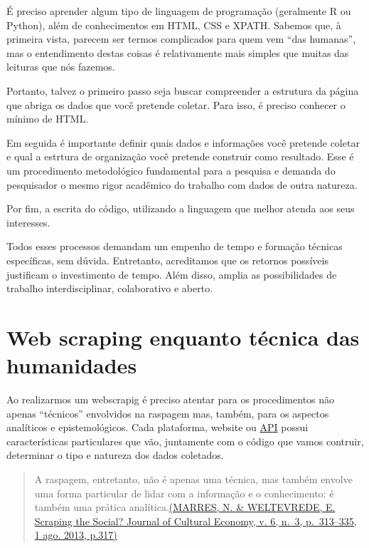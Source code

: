 \documentclass[
]{book}
\begin{document}
É preciso aprender algum tipo de linguagem de programação (geralmente R ou Python), além de conhecimentos em HTML, CSS e XPATH. Sabemos que, à primeira vista, parecem ser termos complicados para quem vem ``das humanas'', mas o entendimento destas coisas é relativamente mais simples que muitas das leituras que nós fazemos.

Portanto, talvez o primeiro passo seja buscar compreender a estrutura da página que abriga os dados que você pretende coletar. Para isso, é preciso conhecer o mínimo de HTML.

Em seguida é importante definir quais dados e informações você pretende coletar e qual a estrtura de organização você pretende construir como resultado. Esse é um procedimento metodológico fundamental para a pesquisa e demanda do pesquisador o mesmo rigor acadêmico do trabalho com dados de outra natureza.

Por fim, a escrita do código, utilizando a linguagem que melhor atenda aos seus interesses.

Todos esses processos demandam um empenho de tempo e formação técnicas específicas, sem dúvida. Entretanto, acreditamos que os retornos possíveis justificam o investimento de tempo. Além disso, amplia as possibilidades de trabalho interdisciplinar, colaborativo e aberto.

\hypertarget{web-scraping-enquanto-tuxe9cnica-das-humanidades}{%
\section{Web scraping enquanto técnica das humanidades}\label{web-scraping-enquanto-tuxe9cnica-das-humanidades}}

Ao realizarmos um webscrapig é preciso atentar para os procedimentos não apenas ``técnicos'' envolvidos na raspagem mas, também, para os aspectos analíticos e epistemológicos. Cada plataforma, website ou \href{https://canaltech.com.br/software/o-que-e-api/}{API} possui características particulares que vão, juntamente com o código que vamos contruir, determinar o tipo e natureza dos dados coletados.

\begin{quote}
A raspagem, entretanto, não é apenas uma técnica, mas também envolve uma forma particular de lidar com a informação e o conhecimento: é também uma prática analítica.\href{https://www.tandfonline.com/doi/abs/10.1080/17530350.2013.772070}{(MARRES, N. \& WELTEVREDE, E. Scraping the Social? Journal of Cultural Economy, v. 6, n.~3, p.~313--335, 1 ago. 2013, p.317)}
\end{quote}
\end{document}
